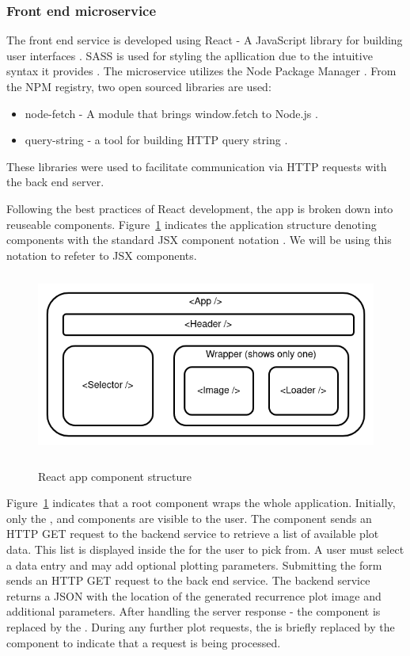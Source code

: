 \documentclass[a4paper,12pt,fleqn]{article}
\begin{document}
\subsubsection{Front end microservice}
The front end service is developed using React - A JavaScript library for building user interfaces \cite{react_home}.
SASS is used for styling the apllication due to the intuitive syntax it provides \cite{sass}.
The microservice utilizes the Node Package Manager \cite{npm}.
From the NPM registry, two open sourced libraries are used:
\begin{itemize}
  \item node-fetch - A module that brings window.fetch to Node.js \cite{node-fetch}.
  \item query-string - a tool for building HTTP query string \cite{query-string}.
\end{itemize}
These libraries were used to facilitate communication via HTTP requests with the back end server.

Following the best practices of React development, the app is broken down into reuseable components. 
Figure~\ref{fig:react_component_structure} indicates the application structure denoting components with the standard JSX component notation 
. We will be using this notation to refeter to JSX components.
\begin{figure}[h]
  \centering
  {\includegraphics[height=6cm]{assets/react_component_structure.png}}
  \caption{React app component structure}
  \label{fig:react_component_structure}
\end{figure}

Figure~\ref{fig:react_component_structure} indicates that a root  component wraps the whole application.
Initially, only the ,  and  components are visible to the user.
The  component sends an HTTP GET request to the backend service to retrieve a list of available plot data.
This list is displayed inside the  for the user to pick from.
A user must select a data entry and may add optional plotting parameters.
Submitting the  form sends an HTTP GET request to the back end service.
The backend service returns a JSON with the location of the generated recurrence plot image and additional parameters.
After handling the server response - the  component is replaced by the .
During any further plot requests, the  is briefly replaced by the  component to indicate that a request is being processed.
\end{document}
